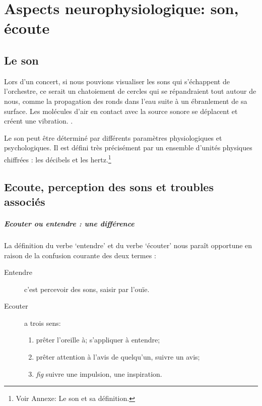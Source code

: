
\chapter{Aspects neurophysiologique: son, écoute}


\section{Le son}

Lors d'un concert, si nous pouvions visualiser les sons qui
s'échappent de l'orchestre, ce serait un chatoiement de cercles qui se
répandraient tout autour de nous, comme 
la propagation des
ronds dans l'eau suite à un ébranlement de sa surface.
Les molécules d'air en contact avec la source sonore se déplacent et
créent une vibration. \autocite[p. 183]{bencivelli:pourquoi,}.


Le son peut être déterminé par différents paramètres
physiologiques et psychologiques.
Il est défini très précisément par un ensemble d'unités physiques chiffrées
: les décibels  et les hertz.\footnote{Voir Annexe: Le son et sa
  définition.}




\section{Ecoute, perception des sons et troubles associés}
\paragraph{Ecouter ou entendre : une différence}

La définition du verbe `entendre' et du verbe `écouter' 
\autocite[pp. 361--385]{hachette:dictionnaire} nous paraît opportune
en raison de la confusion courante des deux termes :
\begin{description}
\item[Entendre] c'est  percevoir des sons, saisir par l'ouïe.
\item[Ecouter] a trois sens: 
\begin{enumerate}
	\item prêter l'oreille à; s'appliquer à entendre;
	\item prêter attention à l'avis de quelqu'un, suivre un avis;
	\item \emph{fig} suivre une impulsion,	une inspiration.
\end{enumerate}
\end{description}

